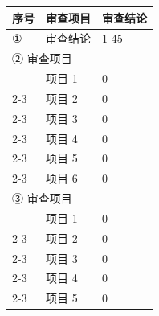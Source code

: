 \documentclass[UTF8,10pt,a4paper,fontset=fandol]{ctexart}
\newcommand{\fieldvalue}[1]{#1}
\newcommand{\handwritten}[1]{#1}
\begin{document}
\begin{tabularx}{\textwidth}{|p{}|X|p{}|}
\hline
\textbf{序号} & \textbf{审查项目} & \textbf{审查结论} \\
\hline
① & 审查结论 & 
\fieldvalue{\handwritten{1}}
\quad
\fieldvalue{\handwritten{45}}
\\
\hline
\multicolumn{3}{|l|}{② \quad 审查项目} \\
\hline
 & 项目 1 &
\fieldvalue{\handwritten{0}}
\\
\cline{2-3}
 & 项目 2 &
\fieldvalue{\handwritten{0}}
\\
\cline{2-3}
 & 项目 3 &
\fieldvalue{\handwritten{0}}
\\
\cline{2-3}
 & 项目 4 &
\fieldvalue{\handwritten{0}}
\\
\cline{2-3}
 & 项目 5 &
\fieldvalue{\handwritten{0}}
\\
\cline{2-3}
 & 项目 6 &
\fieldvalue{\handwritten{0}}
\\
\hline
\multicolumn{3}{|l|}{③ \quad 审查项目} \\
\hline
 & 项目 1 &
\fieldvalue{\handwritten{0}}
\\
\cline{2-3}
 & 项目 2 &
\fieldvalue{\handwritten{0}}
\\
\cline{2-3}
 & 项目 3 &
\fieldvalue{\handwritten{0}}
\\
\cline{2-3}
 & 项目 4 &
\fieldvalue{\handwritten{0}}
\\
\cline{2-3}
 & 项目 5 &
\fieldvalue{\handwritten{0}}

\end{tabularx}
\end{document}
